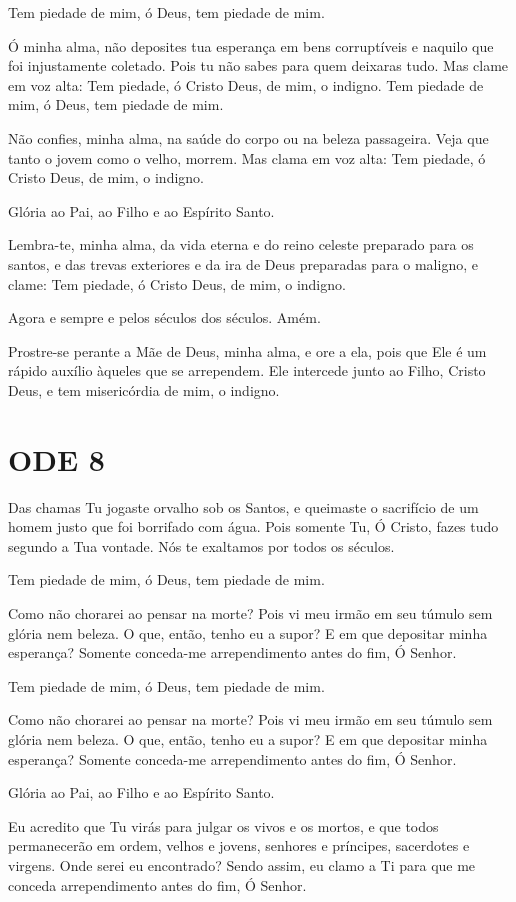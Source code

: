 \documentclass{subfiles}
\begin{document}
Tem piedade de mim, ó Deus, tem piedade de mim.

Ó minha alma, não deposites tua esperança em bens corruptíveis e
naquilo que foi injustamente coletado. Pois tu não sabes para quem deixaras
tudo. Mas clame em voz alta: Tem piedade, ó Cristo Deus, de mim, o indigno.
Tem piedade de mim, ó Deus, tem piedade de mim.

Não confies, minha alma, na saúde do corpo ou na beleza passageira.
Veja que tanto o jovem como o velho, morrem. Mas clama em voz alta: Tem
piedade, ó Cristo Deus, de mim, o indigno.

Glória ao Pai, ao Filho e ao Espírito Santo.

Lembra-te, minha alma, da vida eterna e do reino celeste preparado
para os santos, e das trevas exteriores e da ira de Deus preparadas para o
maligno, e clame: Tem piedade, ó Cristo Deus, de mim, o indigno.

Agora e sempre e pelos séculos dos séculos. Amém.

\theotokion{}Prostre-se perante a Mãe de Deus, minha alma, e ore a ela, pois
que Ele é um rápido auxílio àqueles que se arrependem. Ele intercede junto ao
Filho, Cristo Deus, e tem misericórdia de mim, o indigno.


\section{ODE 8}

\eirmos{}Das chamas Tu jogaste orvalho sob os Santos, e queimaste o sacrifício
de um homem justo que foi borrifado com água. Pois somente Tu, Ó Cristo,
fazes tudo segundo a Tua vontade. Nós te exaltamos por todos os séculos.

Tem piedade de mim, ó Deus, tem piedade de mim.

Como não chorarei ao pensar na morte? Pois vi meu irmão em seu
túmulo sem glória nem beleza. O que, então, tenho eu a supor? E em que
depositar minha esperança? Somente conceda-me arrependimento antes do
fim, Ó Senhor.

Tem piedade de mim, ó Deus, tem piedade de mim.

Como não chorarei ao pensar na morte? Pois vi meu irmão em seu
túmulo sem glória nem beleza. O que, então, tenho eu a supor? E em que
depositar minha esperança? Somente conceda-me arrependimento antes do
fim, Ó Senhor.

Glória ao Pai, ao Filho e ao Espírito Santo.

Eu acredito que Tu virás para julgar os vivos e os mortos, e que todos
permanecerão em ordem, velhos e jovens, senhores e príncipes, sacerdotes e
virgens. Onde serei eu encontrado? Sendo assim, eu clamo a Ti para que me
conceda arrependimento antes do fim, Ó Senhor.
\end{document}
